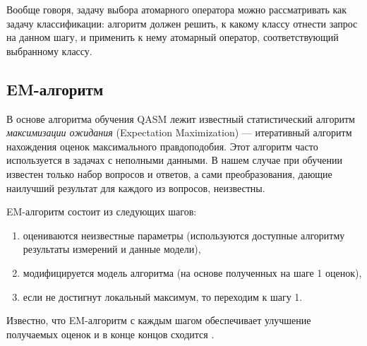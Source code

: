 \documentclass{article}
\begin{document}
Вообще говоря, задачу выбора атомарного оператора можно рассматривать как
задачу классификации: алгоритм должен решить, к какому классу отнести запрос
на данном шагу, и применить к нему атомарный оператор, соответствующий
выбранному классу. 



\subsection{EM-алгоритм}

В основе алгоритма обучения QASM лежит известный статистический алгоритм {\em максимизации ожидания}
(Expectation Maximization) --- итеративный алгоритм нахождения оценок
максимального правдоподобия.
Этот алгоритм часто используется в задачах с неполными данными. В нашем
случае при обучении известен только набор вопросов и ответов, а сами
преобразования, дающие наилучший результат для каждого из вопросов,
неизвестны.

EM-алгоритм состоит из следующих шагов:
\begin{enumerate}
\item оцениваются неизвестные параметры (используются доступные алгоритму результаты измерений и данные модели),
\item модифицируется модель алгоритма (на основе полученных на шаге 1 оценок),
\item если не достигнут локальный максимум, то переходим к шагу 1.
\end{enumerate}

Известно, что EM-алгоритм с каждым шагом обеспечивает улучшение получаемых
оценок %
и в конце концов сходится \cite{dempster:em}.

\end{document}
